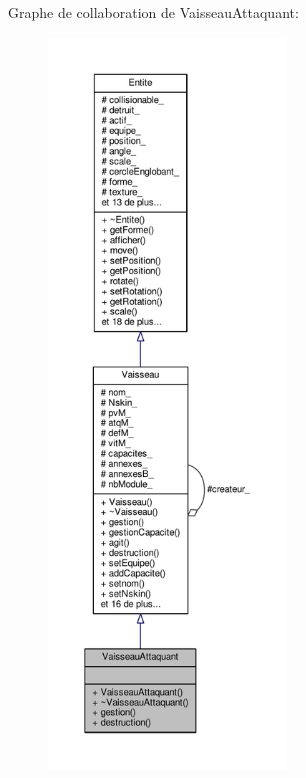 Graphe de collaboration de Vaisseau\+Attaquant\+:\nopagebreak
\begin{figure}[H]
\begin{center}
\leavevmode
\includegraphics[height=550pt]{class_vaisseau_attaquant__coll__graph}
\end{center}
\end{figure}
